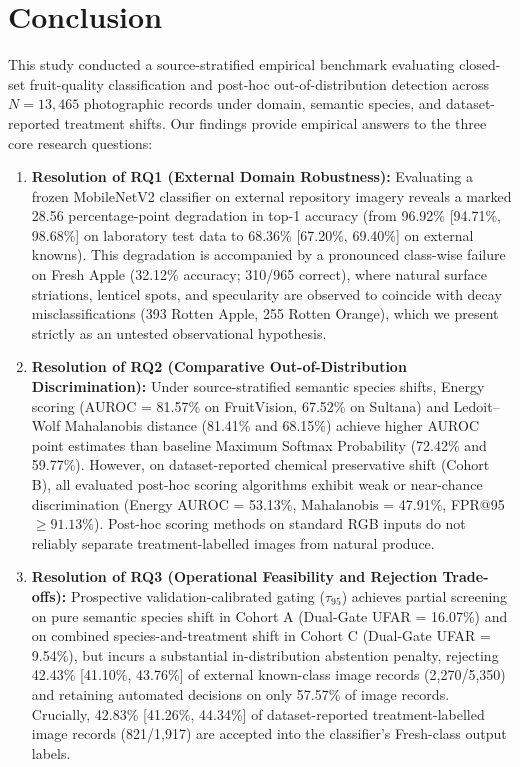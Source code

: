 \section{Conclusion}
\label{sec:conclusion}

This study conducted a source-stratified empirical benchmark evaluating closed-set fruit-quality classification and post-hoc out-of-distribution detection across $N = 13,465$ photographic records under domain, semantic species, and dataset-reported treatment shifts. Our findings provide empirical answers to the three core research questions:
\begin{enumerate}
\setlength{\itemsep}{0pt}\setlength{\parsep}{0pt}\setlength{\parskip}{0pt}\setlength{\topsep}{1pt}\setlength{\partopsep}{0pt}
\item \textbf{Resolution of RQ1 (External Domain Robustness):} Evaluating a frozen MobileNetV2 classifier on external repository imagery reveals a marked 28.56 percentage-point degradation in top-1 accuracy (from 96.92\% [94.71\%, 98.68\%] on laboratory test data to 68.36\% [67.20\%, 69.40\%] on external knowns). This degradation is accompanied by a pronounced class-wise failure on Fresh Apple (32.12\% accuracy; 310/965 correct), where natural surface striations, lenticel spots, and specularity are observed to coincide with decay misclassifications (393 Rotten Apple, 255 Rotten Orange), which we present strictly as an untested observational hypothesis.
\item \textbf{Resolution of RQ2 (Comparative Out-of-Distribution Discrimination):} Under source-stratified semantic species shifts, Energy scoring (AUROC = 81.57\% on FruitVision, 67.52\% on Sultana) and Ledoit--Wolf Mahalanobis distance (81.41\% and 68.15\%) achieve higher AUROC point estimates than baseline Maximum Softmax Probability (72.42\% and 59.77\%). However, on dataset-reported chemical preservative shift (Cohort B), all evaluated post-hoc scoring algorithms exhibit weak or near-chance discrimination (Energy AUROC = 53.13\%, Mahalanobis = 47.91\%, FPR@95 $\ge 91.13\%$). Post-hoc scoring methods on standard RGB inputs do not reliably separate treatment-labelled images from natural produce.
\item \textbf{Resolution of RQ3 (Operational Feasibility and Rejection Trade-offs):} Prospective validation-calibrated gating ($\tau_{95}$) achieves partial screening on pure semantic species shift in Cohort A (Dual-Gate UFAR = 16.07\%) and on combined species-and-treatment shift in Cohort C (Dual-Gate UFAR = 9.54\%), but incurs a substantial in-distribution abstention penalty, rejecting 42.43\% [41.10\%, 43.76\%] of external known-class image records (2,270/5,350) and retaining automated decisions on only 57.57\% of image records. Crucially, 42.83\% [41.26\%, 44.34\%] of dataset-reported treatment-labelled image records (821/1,917) are accepted into the classifier's Fresh-class output labels.
\end{enumerate}

